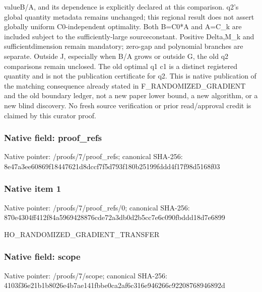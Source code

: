 \documentclass[10pt,a4paper]{article}
\begin{document}
valueB/\allowbreak{}A,\allowbreak{} and its dependence is explicitly declared at this comparison. q2's global quantity metadata remains unchanged;\allowbreak{} this regional result does not assert globally uniform C0-independent optimality. Both B=\allowbreak{}C0*A and A=\allowbreak{}C\_\allowbreak{}k are included subject to the sufficiently-large sourceconstant. Positive Delta,\allowbreak{}M\_\allowbreak{}k and sufficientdimension remain mandatory;\allowbreak{} zero-gap and polynomial branches are separate. Outside J,\allowbreak{} especially when B/\allowbreak{}A grows or outside G,\allowbreak{} the old q2 comparisons remain unclosed. The old optimal q1 c1 is a distinct registered quantity and is not the publication certificate for q2. This is native publication of the matching consequence already stated in F\_\allowbreak{}RANDOMIZED\_\allowbreak{}GRADIENT and the old boundary ledger,\allowbreak{} not a new paper lower bound,\allowbreak{} a new algorithm,\allowbreak{} or a new blind discovery. No fresh source verification or prior read/\allowbreak{}approval credit is claimed by this curator proof.\par\endgroup

\subsubsection{Native field: proof\_\allowbreak{}refs}
Native pointer: /proofs/7/proof\_\allowbreak{}refs; canonical SHA-256: 8e47a3ee60869f18447621d8dccf7f5d793f180b25199fddd4f17f98d5168f03

\subsubsection{Native item 1}
Native pointer: /proofs/7/proof\_\allowbreak{}refs/0; canonical SHA-256: 870e4304ff412f84a5969428876cde72a3db0d2b5cc7e6c090fbddd18d7e6899

\begingroup\raggedright\sloppy HO\_\allowbreak{}RANDOMIZED\_\allowbreak{}GRADIENT\_\allowbreak{}TRANSFER\par\endgroup

\subsubsection{Native field: scope}
Native pointer: /proofs/7/scope; canonical SHA-256: 4103f36e21b1b8026e4b7ae141fbbe0ca2af6c316e946266c92208768946892d
\end{document}
